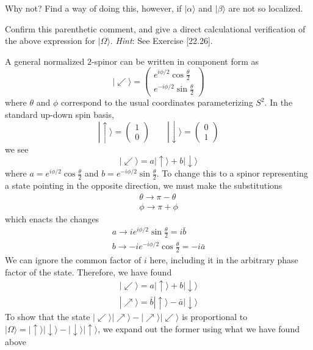 \documentclass[../road-to-reality.tex]{subfiles}
\begin{document}
\begin{questions}
		\question Why not? Find a way of doing this, however, if $|\alpha\rangle$ and $|\beta\rangle$ are not so localized.
		
		\question Confirm this parenthetic comment, and give a direct calculational verification of the above expression for $|\Omega\rangle$. \textit{Hint}: See Exercise [22.26].
		
		\begin{solution}
			A general normalized $2$-spinor can be written in component form as
			\[
				|\!\swarrow\rangle = \begin{pmatrix}e^{i\phi/2}\cos\tfrac{\theta}{2} \\ e^{-i\phi/2}\sin\tfrac{\theta}{2}\end{pmatrix}
			\]
			where $\theta$ and $\phi$ correspond to the usual coordinates parameterizing $S^2$. In the standard up-down spin basis,
			\[
				|\!\uparrow\rangle = \begin{pmatrix}1 \\ 0\end{pmatrix} \qquad |\!\downarrow\rangle = \begin{pmatrix}0 \\ 1\end{pmatrix}
			\]
			we see 
			\[
			|\!\swarrow\rangle = a|\!\uparrow\rangle + b|\!\downarrow\rangle
			\]
			where $a = e^{i\phi/2}\cos\tfrac{\theta}{2}$ and $b = e^{-i\phi/2}\sin\tfrac{\theta}{2}$. To change this to a spinor representing a state pointing in the opposite direction, we must make the substitutions 
			\begin{gather*}
				\theta \to \pi - \theta \\
				\phi \to \pi + \phi
			\end{gather*}
			which enacts the changes
			\begin{gather*}
				a \to ie^{i\phi/2}\sin\tfrac{\theta}{2} = i\bar{b} \\
				b \to -ie^{-i\phi/2}\cos\tfrac{\theta}{2} = -i\bar{a}
			\end{gather*}
			We can ignore the common factor of $i$ here, including it in the arbitrary phase factor of the state. Therefore, we have found
			\begin{gather*}
				|\!\swarrow\rangle = a|\!\uparrow\rangle + b|\!\downarrow\rangle \\
				|\!\nearrow\rangle = \bar{b}|\!\uparrow\rangle - \bar{a}|\!\downarrow\rangle 
			\end{gather*}
			To show that the state $|\!\swarrow\rangle|\!\nearrow\rangle - |\!\nearrow\rangle|\!\swarrow\rangle$ is proportional to $|\Omega\rangle = |\!\uparrow\rangle|\!\downarrow\rangle - |\!\downarrow\rangle|\!\uparrow\rangle$, we expand out the former using what we have found above

\end{solution}
\end{questions}
\end{document}
